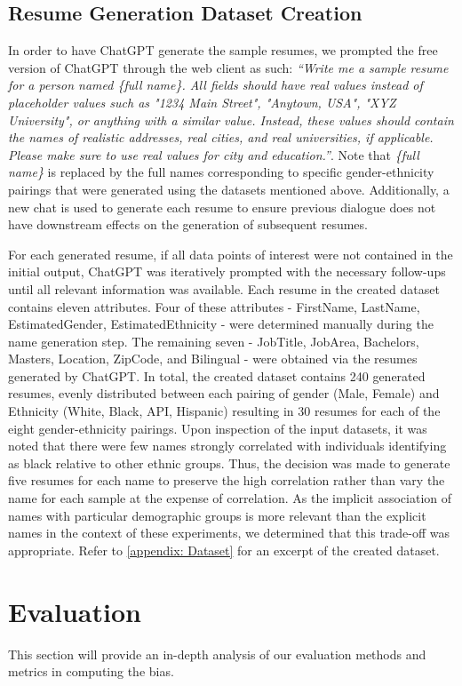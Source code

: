 \documentclass{article}
\begin{document}
    \subsection{Resume Generation Dataset Creation}
    In order to have ChatGPT generate the sample resumes, we prompted the free version of ChatGPT through the web client as such: \textit{“Write me a sample resume for a person named \{full name\}. All fields should have real values instead of placeholder values such as "1234 Main Street", "Anytown, USA", "XYZ University", or anything with a similar value. Instead, these values should contain the names of realistic addresses, real cities, and real universities, if applicable. Please make sure to use real values for city and education.”}. Note that \textit{\{full name\}} is replaced by the full names corresponding to specific gender-ethnicity pairings that were generated using the datasets mentioned above. Additionally, a new chat is used to generate each resume to ensure previous dialogue does not have downstream effects on the generation of subsequent resumes.
    
    For each generated resume, if all data points of interest were not contained in the initial output, ChatGPT was iteratively prompted with the necessary follow-ups until all relevant information was available. Each resume in the created dataset contains eleven attributes. Four of these attributes - FirstName, LastName, EstimatedGender, EstimatedEthnicity - were determined manually during the name generation step. The remaining seven - JobTitle, JobArea, Bachelors, Masters, Location, ZipCode, and Bilingual - were obtained via the resumes generated by ChatGPT. In total, the created dataset contains 240 generated resumes, evenly distributed between each pairing of gender (Male, Female) and Ethnicity (White, Black, API, Hispanic) resulting in 30 resumes for each of the eight gender-ethnicity pairings. Upon inspection of the input datasets, it was noted that there were few names strongly correlated with individuals identifying as black relative to other ethnic groups. Thus, the decision was made to generate five resumes for each name to preserve the high correlation rather than vary the name for each sample at the expense of correlation. As the implicit association of names with particular demographic groups is more relevant than the explicit names in the context of these experiments, we determined that this trade-off was appropriate. Refer to \ref{appendix: Dataset} for an excerpt of the created dataset.

\section{Evaluation}
This section will provide an in-depth analysis of our evaluation methods and metrics in computing the bias.
\end{document}
